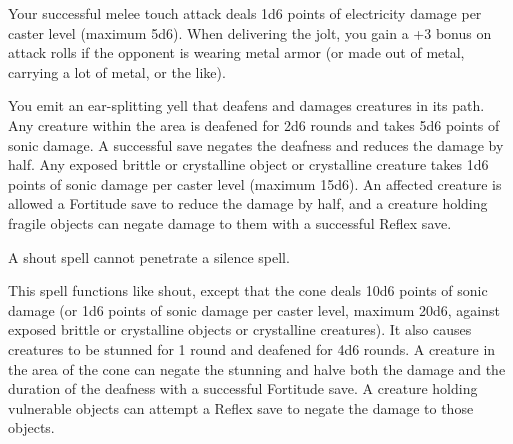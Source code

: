 \begin{multicols}{2}
\begin{small}
\noindent Your successful melee touch attack deals 1d6 points of electricity damage per caster level (maximum 5d6). When delivering the jolt, you gain a +3 bonus on attack rolls if the opponent is wearing metal armor (or made out of metal, carrying a lot of metal, or the like).

\noindent You emit an ear-splitting yell that deafens and damages creatures in its path. Any creature within the area is deafened for 2d6 rounds and takes 5d6 points of sonic damage. A successful save negates the deafness and reduces the damage by half. Any exposed brittle or crystalline object or crystalline creature takes 1d6 points of sonic damage per caster level (maximum 15d6). An affected creature is allowed a Fortitude save to reduce the damage by half, and a creature holding fragile objects can negate damage to them with a successful Reflex save.

\smallskip\noindent A shout spell cannot penetrate a silence spell.

\noindent This spell functions like shout, except that the cone deals 10d6 points of sonic damage (or 1d6 points of sonic damage per caster level, maximum 20d6, against exposed brittle or crystalline objects or crystalline creatures). It also causes creatures to be stunned for 1 round and deafened for 4d6 rounds. A creature in the area of the cone can negate the stunning and halve both the damage and the duration of the deafness with a successful Fortitude save. A creature holding vulnerable objects can attempt a Reflex save to negate the damage to those objects.


\end{small}
\end{multicols}
